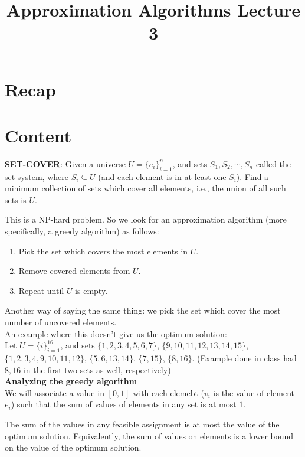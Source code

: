 \documentclass[a4paper]{article}
\title{\textbf{Approximation Algorithms Lecture 3}}
\date{}
\newcommand{\nl}{\vspace{0.2cm}\\}
\begin{document}
\maketitle
\tableofcontents

\section{Recap}

\section{Content}

\begin{defn}
    \textbf{SET-COVER}: Given a universe $U = \{e_i\}_{i=1}^n$, and sets $S_1, S_2, \cdots, S_n$ called the set system, where $S_i \subseteq U$ (and each element is in at least one $S_i$). Find a
    minimum collection of sets which cover all elements, i.e., the union of all such sets is $U$.
\end{defn}

This is a NP-hard problem. So we look for an approximation algorithm (more specifically, a greedy algorithm) as follows:

\begin{enumerate}
    \item Pick the set which covers the most elements in $U$.
    \item Remove covered elements from $U$.
    \item Repeat until $U$ is empty.
\end{enumerate}

Another way of saying the same thing: we pick the set which cover the most number of uncovered elements.\nl
An example where this doesn't give us the optimum solution:\nl
Let $U = \{i\}_{i = 1}^{16}$, and sets $\{1, 2, 3, 4, 5, 6, 7\}$, $\{9, 10, 11, 12, 13, 14, 15\}$, $\{1, 2, 3, 4, 9, 10, 11, 12\}$, $\{5, 6, 13, 14\}$, $\{7, 15\}$, $\{8, 16\}$. (Example done in
class had $8, 16$ in the first two sets as well, respectively)\nl

\textbf{Analyzing the greedy algorithm}\nl
We will associate a value in $[0, 1]$ with each elemebt ($v_i$ is the value of element $e_i$) such that the sum of values of elements in any set is at most $1$.\nl

\begin{claim}
    The sum of the values in any feasible assignment is at most the value of the optimum solution. Equivalently, the sum of values on elements is a lower bound on the value of the optimum solution.
\end{claim}
\end{document}
